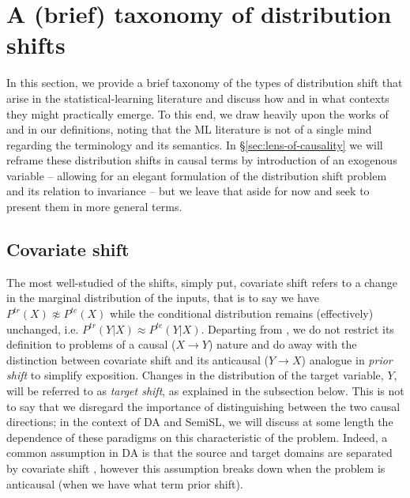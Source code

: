 \section{A (brief) taxonomy of distribution shifts}\label{sec:dist-shift}
In this section, we provide a brief taxonomy of the types of distribution shift that arise in the
statistical-learning literature and discuss how and in what contexts they might practically emerge.
%
To this end, we draw heavily upon the works of \cite{moreno2012unifying} and
\cite{castro2020causality} in our definitions, noting that the ML literature is not of a
single mind regarding the terminology and its semantics.
%
In \S\ref{sec:lens-of-causality} we will reframe these distribution shifts in causal terms by
introduction of an exogenous variable -- allowing for an elegant formulation of the distribution
shift problem and its relation to invariance -- but we leave that aside for now and seek to present
them in more general terms.
\subsection{Covariate shift}\label{ssec:covariate-shift}
The most well-studied of the shifts, simply put, covariate shift refers to a change in the marginal
distribution of the inputs, that is to say we have \( P^{tr}(X) \not\approx P^{te}(X) \) while the
conditional distribution remains (effectively) unchanged, i.e. \( P^{tr}(Y|X) \approx P^{te}(Y|X) \).
%
Departing from \cite{moreno2012unifying}, we do not restrict its definition to problems of a causal
(\( X \to Y\)) nature and do away with the distinction between covariate shift and its anticausal
(\( Y \to X \)) analogue in \emph{prior shift} to simplify exposition.
%
Changes in the distribution of the target variable, \(Y\), will be referred to as \emph{target
shift}, as explained in the subsection below.
%
This is not to say that we disregard the importance of distinguishing between the two causal
directions; in the context of DA and SemiSL, we will discuss at some length the dependence of these
paradigms on this characteristic of the problem.
%
Indeed, a common assumption in DA is that the source and target domains are separated by covariate
shift \citep{david2010impossibility}, however this assumption breaks down when the problem is
anticausal (when we have what \cite{moreno2012unifying} term prior shift).

